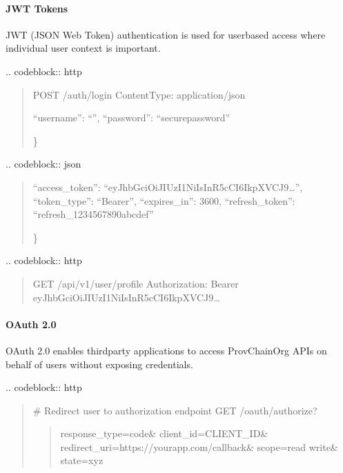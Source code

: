 \documentclass[letterpaper,10pt,english]{sphinxmanual}
\begin{document}
\paragraph{JWT Tokens}
\label{\detokenize{api/authentication:jwt-tokens}}
\sphinxAtStartPar
JWT (JSON Web Token) authentication is used for user\sphinxhyphen{}based access where individual user context is important.

\sphinxAtStartPar
{}
.. code\sphinxhyphen{}block:: http
\begin{quote}

\sphinxAtStartPar
POST /auth/login
Content\sphinxhyphen{}Type: application/json
\begin{description}
\sphinxlineitem{\{}
\sphinxAtStartPar
“username”: “”,
“password”: “secure\sphinxhyphen{}password”

\end{description}

\sphinxAtStartPar
\}
\end{quote}

\sphinxAtStartPar
{}
.. code\sphinxhyphen{}block:: json
\begin{quote}
\begin{description}
\sphinxlineitem{\{}
\sphinxAtStartPar
“access\_token”: “eyJhbGciOiJIUzI1NiIsInR5cCI6IkpXVCJ9…”,
“token\_type”: “Bearer”,
“expires\_in”: 3600,
“refresh\_token”: “refresh\_1234567890abcdef”

\end{description}

\sphinxAtStartPar
\}
\end{quote}

\sphinxAtStartPar
{}
.. code\sphinxhyphen{}block:: http
\begin{quote}

\sphinxAtStartPar
GET /api/v1/user/profile
Authorization: Bearer eyJhbGciOiJIUzI1NiIsInR5cCI6IkpXVCJ9…
\end{quote}


\paragraph{OAuth 2.0}
\label{\detokenize{api/authentication:oauth-2-0}}
\sphinxAtStartPar
OAuth 2.0 enables third\sphinxhyphen{}party applications to access ProvChainOrg APIs on behalf of users without exposing credentials.

\sphinxAtStartPar
{}
.. code\sphinxhyphen{}block:: http
\begin{quote}

\sphinxAtStartPar
\# Redirect user to authorization endpoint
GET /oauth/authorize?
\begin{quote}

\sphinxAtStartPar
response\_type=code\&
client\_id=CLIENT\_ID\&
redirect\_uri=https://your\sphinxhyphen{}app.com/callback\&
scope=read write\&
state=xyz
\end{quote}
\end{quote}
\end{document}
